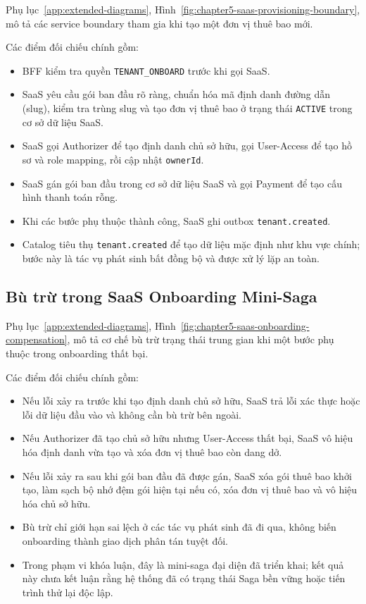 Phụ lục~\ref{app:extended-diagrams}, Hình~\ref{fig:chapter5-saas-provisioning-boundary}, mô tả các service boundary tham gia khi tạo một đơn vị thuê bao mới.

Các điểm đối chiếu chính gồm:

\begin{itemize}
  \item BFF kiểm tra quyền \texttt{TENANT\_ONBOARD} trước khi gọi SaaS.
  \item SaaS yêu cầu gói ban đầu rõ ràng, chuẩn hóa mã định danh đường dẫn (slug), kiểm tra trùng slug và tạo đơn vị thuê bao ở trạng thái \texttt{ACTIVE} trong cơ sở dữ liệu SaaS.
  \item SaaS gọi Authorizer để tạo định danh chủ sở hữu, gọi User-Access để tạo hồ sơ và role mapping, rồi cập nhật \texttt{ownerId}.
  \item SaaS gán gói ban đầu trong cơ sở dữ liệu SaaS và gọi Payment để tạo cấu hình thanh toán rỗng.
  \item Khi các bước phụ thuộc thành công, SaaS ghi outbox \texttt{tenant.created}.
  \item Catalog tiêu thụ \texttt{tenant.created} để tạo dữ liệu mặc định như khu vực chính; bước này là tác vụ phát sinh bất đồng bộ và được xử lý lặp an toàn.
\end{itemize}

\subsection{Bù trừ trong SaaS Onboarding Mini-Saga}

Phụ lục~\ref{app:extended-diagrams}, Hình~\ref{fig:chapter5-saas-onboarding-compensation}, mô tả cơ chế bù trừ trạng thái trung gian khi một bước phụ thuộc trong onboarding thất bại.

Các điểm đối chiếu chính gồm:

\begin{itemize}
  \item Nếu lỗi xảy ra trước khi tạo định danh chủ sở hữu, SaaS trả lỗi xác thực hoặc lỗi dữ liệu đầu vào và không cần bù trừ bên ngoài.
  \item Nếu Authorizer đã tạo chủ sở hữu nhưng User-Access thất bại, SaaS vô hiệu hóa định danh vừa tạo và xóa đơn vị thuê bao còn dang dở.
  \item Nếu lỗi xảy ra sau khi gói ban đầu đã được gán, SaaS xóa gói thuê bao khởi tạo, làm sạch bộ nhớ đệm gói hiện tại nếu có, xóa đơn vị thuê bao và vô hiệu hóa chủ sở hữu.
  \item Bù trừ chỉ giới hạn sai lệch ở các tác vụ phát sinh đã đi qua, không biến onboarding thành giao dịch phân tán tuyệt đối.
  \item Trong phạm vi khóa luận, đây là mini-saga đại diện đã triển khai; kết quả này chưa kết luận rằng hệ thống đã có trạng thái Saga bền vững hoặc tiến trình thử lại độc lập.
\end{itemize}

